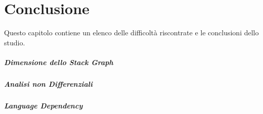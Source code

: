 \chapter{Conclusione}

Questo capitolo contiene un elenco delle difficolt\`a riscontrate e le conclusioni dello studio.

\paragraph{Dimensione dello Stack Graph}

\paragraph{Analisi non Differenziali}

\paragraph{Language Dependency}
